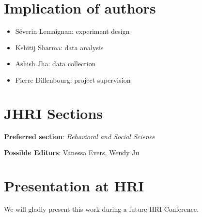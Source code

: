 \documentclass{article}
\begin{document}
\section{Implication of authors}

\begin{itemize}
\item Séverin Lemaignan: experiment design
\item Kshitij Sharma: data analysis
\item Ashish Jha: data collection
\item Pierre Dillenbourg: project supervision
\end{itemize}

\section{JHRI Sections}

\textbf{Preferred section}: \emph{Behavioral and Social Science}

\textbf{Possible Editors}: Vanessa Evers, Wendy Ju

\section{Presentation at HRI}

We will gladly present this work during a future HRI Conference.
\end{document}

